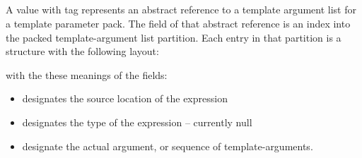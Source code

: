 
\subsection{}
\label{sec:ifc:ExprSort:PackedTemplateArguments}

A  value with tag  represents an
abstract reference to a template argument list for a template parameter pack.  The 
 field of that abstract reference is an index into the packed template-argument
list partition.  Each entry in that partition is a structure with the following layout:
%
\begin{figure}[H]
	\centering
\end{figure}
%
with the these meanings of the fields:
\begin{itemize}
	\item {} designates the source location of the expression
	\item {} designates the type of the expression -- currently null
	\item {} designate the actual argument, or sequence of template-arguments.
\end{itemize}








